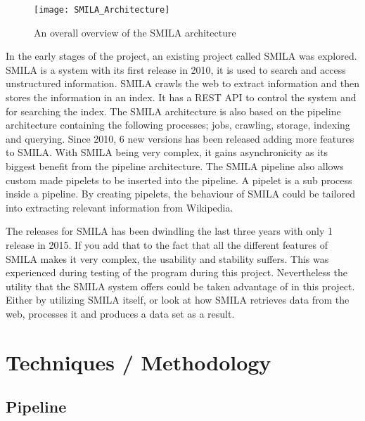 \begin{figure}[h]
\caption{An overall overview of the SMILA architecture}
\texttt{[image: SMILA\_Architecture]}
\end{figure}



In the early stages of the project, an existing project called SMILA\cite{smila} was explored. SMILA is a system with its first release in 2010, it is used to search and access unstructured information. SMILA crawls the web to extract information and then stores the information in an index. It has a REST API to control the system and for searching the index. The SMILA architecture is also based on the pipeline architecture containing the following processes; jobs, crawling, storage, indexing and querying. Since 2010, 6 new versions has been released adding more features to SMILA. With SMILA being very complex, it gains asynchronicity as its biggest benefit from the pipeline architecture. The SMILA pipeline also allows custom made pipelets to be inserted into the pipeline. A pipelet is a sub process inside a pipeline. By creating pipelets, the behaviour of SMILA could be tailored into extracting relevant information from Wikipedia.

The releases for SMILA has been dwindling the last three years with only 1 release in 2015. If you add that to the fact that all the different features of SMILA makes it very complex, the usability and stability suffers. This was experienced during testing of the program during this project.
Nevertheless the utility that the SMILA system offers could be taken advantage of in this project. Either by utilizing SMILA itself, or look at how SMILA retrieves data from the web, processes it and produces a data set as a result.


\section{Techniques / Methodology}

\subsection{Pipeline} \label{pipeline}

